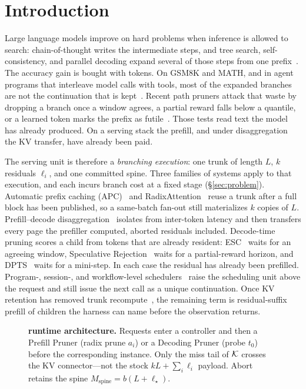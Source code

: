 \section{Introduction}
\label{sec:intro}

Large language models improve on hard problems when inference is allowed to search: chain-of-thought writes the intermediate steps, and tree search, self-consistency, and parallel decoding expand several of those steps from one prefix~\cite{cot,tot,selfconsistency,esc}.
The accuracy gain is bought with tokens.
On GSM8K and MATH, and in agent programs that interleave model calls with tools, most of the expanded branches are not the continuation that is kept~\cite{gsm8k,math,react,sweagent}.
Recent path pruners attack that waste by dropping a branch once a window agrees, a partial reward falls below a quantile, or a learned token marks the prefix as futile~\cite{esc,specrej,dpts,equivpruner,stoploss}.
Those tests read text the model has already produced.
On a serving stack the prefill, and under disaggregation the KV transfer, have already been paid.

The serving unit is therefore a \emph{branching execution}: one trunk of length $L$, $k$ residuals $\ell_i$, and one committed spine.
Three families of systems apply to that execution, and each incurs branch cost at a fixed stage (\S\ref{sec:problem}).
Automatic prefix caching (APC)~\cite{vllm} and RadixAttention~\cite{sglang} reuse a trunk after a full block has been published, so a same-batch fan-out still materializes $k$ copies of $L$.
Prefill--decode disaggregation~\cite{distserve,splitwise} isolates \ttft{} from inter-token latency and then transfers every page the prefiller computed, aborted residuals included.
Decode-time pruning scores a child from tokens that are already resident: ESC~\cite{esc} waits for an agreeing window, Speculative Rejection~\cite{specrej} waits for a partial-reward horizon, and DPTS~\cite{dpts} waits for a mini-step.
In each case the residual has already been prefilled.
Program-, session-, and workflow-level schedulers~\cite{autellix,thunderagent,continuum,mori,ayo,parrot,pythia} raise the scheduling unit above the request and still issue the next call as a unique continuation.
Once KV retention has removed trunk recompute~\cite{continuum,mori}, the remaining \ttft{} term is residual-suffix prefill of children the harness can name before the observation returns.

\begin{figure}[t]
\centering
\resizebox{\textwidth}{!}{}
\caption{\textbf{\sys{} runtime architecture.}
Requests enter a controller and then a Prefill Pruner (radix prune $a_i$) or a Decoding Pruner (probe $t_0$) before the corresponding instance.
Only the miss tail of $\mathcal{K}$ crosses the KV connector---not the stock $kL+\sum_i\ell_i$ payload.
Abort retains the spine $M_{\mathrm{spine}}=b(L+\ell_\star)$.}
\label{fig:system}
\end{figure}

